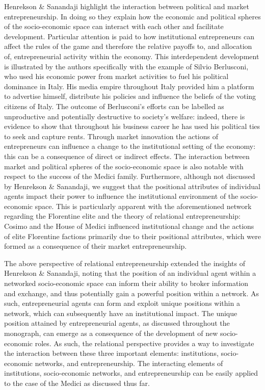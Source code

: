 Henrekson \& Sanandaji highlight the interaction between political and market entrepreneurship. In doing so they explain how the economic and political spheres of the socio-economic space can interact with each other and facilitate development. Particular attention is paid to how institutional entrepreneurs can affect the rules of the game and therefore the relative payoffs to, and allocation of, entrepreneurial activity within the economy. This interdependent development is illustrated by the authors specifically with the example of Silvio Berlusconi, who used his economic power from market activities to fuel his political dominance in Italy. His media empire throughout Italy provided him a platform to advertise himself, distribute his policies and influence the beliefs of the voting citizens of Italy. The outcome of Berlusconi's efforts can be labelled as unproductive and potentially destructive to society's welfare: indeed, there is evidence to show that throughout his business career he has used his political ties to seek and capture rents. Through market innovation the actions of entrepreneurs can influence a change to the institutional setting of the economy: this can be a consequence of direct or indirect effects. The interaction between market and political spheres of the socio-economic space is also notable with respect to the success of the Medici family. Furthermore, although not discussed by Henrekson \& Sanandaji, we suggest that the positional attributes of individual agents impact their power to influence the institutional environment of the socio-economic space. This is particularly apparent with the aforementioned network regarding the Florentine elite and the theory of relational entrepreneurship: Cosimo and the House of Medici influenced institutional change and the actions of elite Florentine factions primarily due to their positional attributes, which were formed as a consequence of their market entrepreneurship.

The above perspective of relational entrepreneurship extended the insights of Henrekson \& Sanandaji, noting that the position of an individual agent within a networked socio-economic space can inform their ability to broker information and exchange, and thus potentially gain a powerful position within a network. As such, entrepreneurial agents can form and exploit unique positions within a network, which can subsequently have an institutional impact. The unique position attained by entrepreneurial agents, as discussed throughout the monograph, can emerge as a consequence of the development of new socio-economic roles. As such, the relational perspective provides a way to investigate the interaction between these three important elements: institutions, socio-economic networks, and entrepreneurship. The interacting elements of institutions, socio-economic networks, and entrepreneurship can be easily applied to the case of the Medici as discussed thus far.

